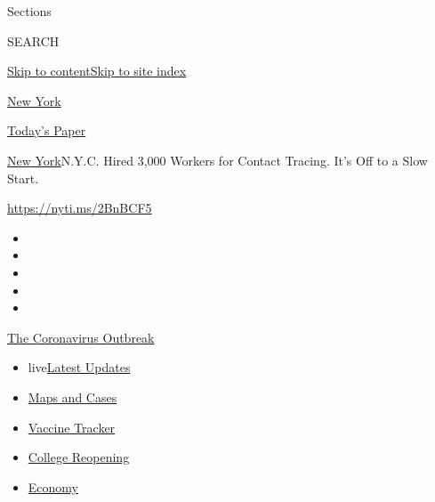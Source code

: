 Sections

SEARCH

\protect\hyperlink{site-content}{Skip to
content}\protect\hyperlink{site-index}{Skip to site index}

\href{https://www.nytimes3xbfgragh.onion/section/nyregion}{New York}

\href{https://myaccount.nytimes3xbfgragh.onion/auth/login?response_type=cookie\&client_id=vi}{}

\href{https://www.nytimes3xbfgragh.onion/section/todayspaper}{Today's
Paper}

\href{/section/nyregion}{New York}\textbar{}N.Y.C. Hired 3,000 Workers
for Contact Tracing. It's Off to a Slow Start.

\url{https://nyti.ms/2BnBCF5}

\begin{itemize}
\item
\item
\item
\item
\item
\end{itemize}

\href{https://www.nytimes3xbfgragh.onion/news-event/coronavirus?action=click\&pgtype=Article\&state=default\&region=TOP_BANNER\&context=storylines_menu}{The
Coronavirus Outbreak}

\begin{itemize}
\tightlist
\item
  live\href{https://www.nytimes3xbfgragh.onion/2020/08/04/world/coronavirus-cases.html?action=click\&pgtype=Article\&state=default\&region=TOP_BANNER\&context=storylines_menu}{Latest
  Updates}
\item
  \href{https://www.nytimes3xbfgragh.onion/interactive/2020/us/coronavirus-us-cases.html?action=click\&pgtype=Article\&state=default\&region=TOP_BANNER\&context=storylines_menu}{Maps
  and Cases}
\item
  \href{https://www.nytimes3xbfgragh.onion/interactive/2020/science/coronavirus-vaccine-tracker.html?action=click\&pgtype=Article\&state=default\&region=TOP_BANNER\&context=storylines_menu}{Vaccine
  Tracker}
\item
  \href{https://www.nytimes3xbfgragh.onion/2020/08/02/us/covid-college-reopening.html?action=click\&pgtype=Article\&state=default\&region=TOP_BANNER\&context=storylines_menu}{College
  Reopening}
\item
  \href{https://www.nytimes3xbfgragh.onion/live/2020/08/04/business/stock-market-today-coronavirus?action=click\&pgtype=Article\&state=default\&region=TOP_BANNER\&context=storylines_menu}{Economy}
\end{itemize}

